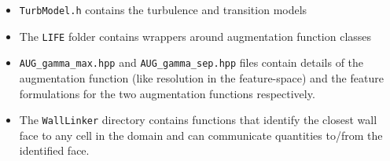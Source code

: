 \documentclass{article}
\begin{document}
\begin{itemize}
\begin{itemize}
              \item \texttt{TurbModel.h} contains the turbulence and transition models
              \item The \texttt{LIFE} folder contains wrappers around augmentation function classes
              \item \texttt{AUG\_gamma\_max.hpp} and \texttt{AUG\_gamma\_sep.hpp} files contain details of the augmentation function (like resolution in the feature-space) and the feature formulations for the two augmentation functions respectively. 
              \item The \texttt{WallLinker} directory contains functions that identify the closest wall face to any cell in the domain and can communicate quantities to/from the identified face.
          \end{itemize}
\end{itemize}
\end{document}
